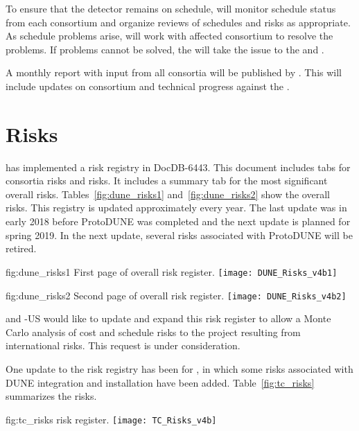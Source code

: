 To ensure that the  detector remains on schedule,
 will monitor schedule status from each consortium and organize
reviews of schedules and risks as appropriate.  As schedule problems
arise,  will work with affected consortium to resolve the
problems. If problems cannot be solved, the  will take the issue to the
 and .

A monthly report with input from all consortia will be published by
. This will include updates on consortium and 
technical progress against the .

\section{Risks}
\label{sec:fdsp-coord-risks}

 has implemented a risk registry in DocDB-6443. This
document includes tabs for consortia risks and  risks. It
includes a summary tab for the most significant overall 
risks. Tables~\ref{fig:dune_risks1} and~\ref{fig:dune_risks2} show the
overall  risks. This registry is updated approximately
every year. The last update was in early 2018 before ProtoDUNE was completed and the next update is
planned for spring 2019. In the next update, several risks associated
with ProtoDUNE will be retired.
\begin{dunefigure}{fig:dune_risks1}
  {First page of  overall risk register.}
  \texttt{[image: DUNE\_Risks\_v4b1]}
\end{dunefigure}
\begin{dunefigure}{fig:dune_risks2}
  {Second page of  overall risk register.}
  \texttt{[image: DUNE\_Risks\_v4b2]}
\end{dunefigure}
 and -US would like  to update and
expand this risk register to allow a Monte Carlo analysis of cost and
schedule risks to the  project resulting from international
 risks. This request is under consideration.

One update to the risk registry has been for , in which some
risks  associated with  DUNE  integration and  installation have  been
added. Table~\ref{fig:tc_risks} summarizes the  risks.
\begin{dunefigure}{fig:tc_risks}
  { risk register.}
  \texttt{[image: TC\_Risks\_v4b]}
\end{dunefigure}

